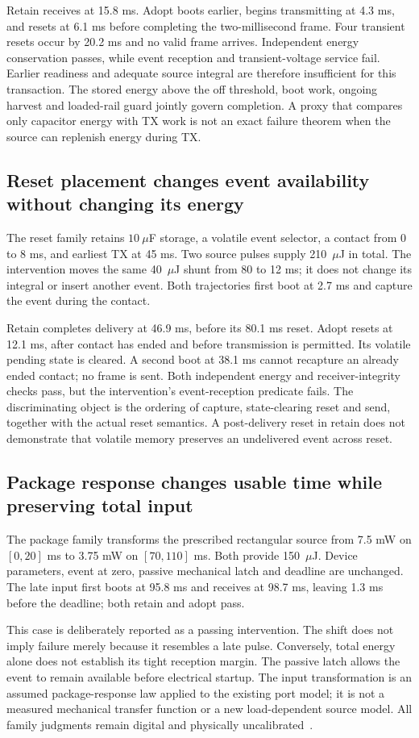 Retain receives at 15.8 ms. Adopt boots earlier, begins transmitting at 4.3 ms,
and resets at 6.1 ms before completing the two-millisecond frame. Four
transient resets occur by 20.2 ms and no valid frame arrives. Independent
energy conservation passes, while event reception and transient-voltage service
fail. Earlier readiness and adequate source integral are therefore insufficient
for this transaction. The stored energy above the off threshold, boot work,
ongoing harvest and loaded-rail guard jointly govern completion. A proxy that
compares only capacitor energy with TX work is not an exact failure theorem
when the source can replenish energy during TX.

\subsection{Reset placement changes event availability without changing its energy}
The reset family retains $10~\mu$F storage, a volatile event selector, a contact
from 0 to 8 ms, and earliest TX at 45 ms. Two source pulses supply
210~$\mu$J in total. The intervention moves the same 40~$\mu$J shunt
from 80 to 12 ms; it does not change its integral or insert another event.
Both trajectories first boot at 2.7 ms and capture the event during the contact.

Retain completes delivery at 46.9 ms, before its 80.1 ms reset. Adopt resets
at 12.1 ms, after contact has ended and before transmission is permitted.
Its volatile pending state is cleared. A second boot at 38.1 ms cannot recapture
an already ended contact; no frame is sent. Both independent energy and
receiver-integrity checks pass, but the intervention's event-reception
predicate fails. The discriminating object is the ordering of capture,
state-clearing reset and send, together with the actual reset semantics.
A post-delivery reset in retain does not demonstrate that volatile memory
preserves an undelivered event across reset.

\subsection{Package response changes usable time while preserving total input}
The package family transforms the prescribed rectangular source from
7.5 mW on $[0,20]$ ms to 3.75 mW on $[70,110]$ ms. Both provide
150~$\mu$J. Device parameters, event at zero, passive mechanical latch
and deadline are unchanged. The late input first boots at 95.8 ms and receives
at 98.7 ms, leaving 1.3 ms before the deadline; both retain and adopt pass.

This case is deliberately reported as a passing intervention. The shift does
not imply failure merely because it resembles a late pulse. Conversely, total
energy alone does not establish its tight reception margin. The passive latch
allows the event to remain available before electrical startup. The input
transformation is an assumed package-response law applied to the existing
port model; it is not a measured mechanical transfer function or a new
load-dependent source model. All family judgments remain digital and
physically uncalibrated~\cite{abcb}.
\FloatBarrier
